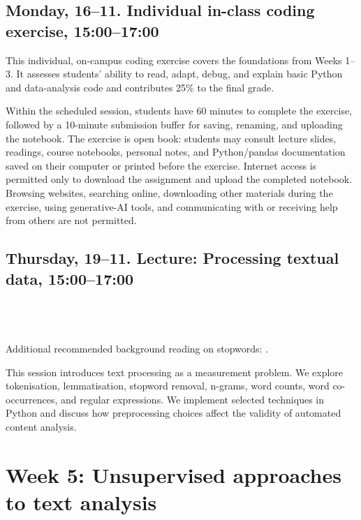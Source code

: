 \subsection*{Monday, 16--11. Individual in-class coding exercise, 15:00--17:00}

This individual, on-campus coding exercise covers the foundations from Weeks 1--3. It assesses students' ability to read, adapt, debug, and explain basic Python and data-analysis code and contributes 25\% to the final grade.

Within the scheduled session, students have 60 minutes to complete the exercise, followed by a 10-minute submission buffer for saving, renaming, and uploading the notebook. The exercise is open book: students may consult lecture slides, readings, course notebooks, personal notes, and Python/pandas documentation saved on their computer or printed before the exercise. Internet access is permitted only to download the assignment and upload the completed notebook. Browsing websites, searching online, downloading other materials during the exercise, using generative-AI tools, and communicating with or receiving help from others are not permitted.

\subsection*{Thursday, 19--11. Lecture: Processing textual data, 15:00--17:00}

\\
\\
\\

Additional recommended background reading on stopwords: \cite{Nothman2018}.

This session introduces text processing as a measurement problem. We explore tokenisation, lemmatisation, stopword removal, n-grams, word counts, word co-occurrences, and regular expressions. We implement selected techniques in Python and discuss how preprocessing choices affect the validity of automated content analysis.


\section*{Week 5: Unsupervised approaches to text analysis}

